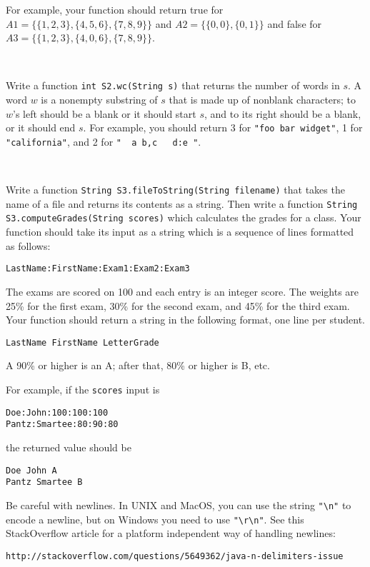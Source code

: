 \documentclass{jhwhw}
\newcommand{\task}{%
\mbox{ }\\ %
\noindent{\bf Task:}
}
\begin{document}
For example, your function should return true for 
$A1 = \{ \{1,2,3\}, \{4,5,6\}, \{7,8,9\}\}$
and $A2 = \{ \{0,0\}, \{0,1\}\}$ and false for
$A3 =\{ \{1,2,3\}, \{4,0,6\}, \{7,8,9\}\}$.


\task
Write a function \texttt{int S2.wc(String s)} that returns the number of words in $s$.
A word $w$ is a nonempty substring of $s$ that is made up of nonblank characters; to $w$'s 
left should be a blank or it should start $s$, and to its right should be a blank, or 
it should end $s$. For example, you should return 3 for \verb+"foo bar widget"+,
1 for \verb+"california"+, and 2 for \verb+"  a b,c   d:e "+.


\task
Write a function \texttt{String S3.fileToString(String filename)} that takes the name of a file
and returns its contents as a string. Then write a function 
\texttt{String S3.computeGrades(String scores)}
which calculates the
grades for a class. Your function should take its input as a string which is a sequence
of lines formatted as follows:
\begin{verbatim}
LastName:FirstName:Exam1:Exam2:Exam3
\end{verbatim}
The exams are scored on 100 and each entry is an integer score. 
The weights are 25\% for the first exam, 30\% for the second
exam, and 45\% for the third exam. Your function should return a string in the following 
format, one line per student.
\begin{verbatim}
LastName FirstName LetterGrade
\end{verbatim}
A 90\% or higher is an A; after that, 80\% or higher is B, etc.


For example, if the \texttt{scores} input is
\begin{verbatim}
Doe:John:100:100:100
Pantz:Smartee:80:90:80
\end{verbatim}
the returned value should be
\begin{verbatim}
Doe John A
Pantz Smartee B
\end{verbatim}

Be careful with newlines. In UNIX and MacOS, you can use the string \verb+"\n"+
to encode a newline, but on Windows you need to use \verb+"\r\n"+. See
this StackOverflow article for a platform independent way
of handling newlines: 
\begin{verbatim}
http://stackoverflow.com/questions/5649362/java-n-delimiters-issue
\end{verbatim}
\end{document}
